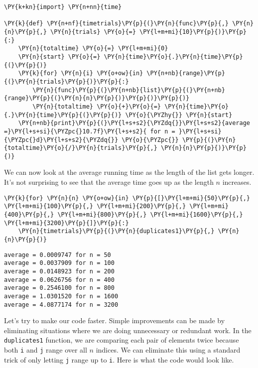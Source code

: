 \begin{Verbatim}[commandchars=\\\{\}]
\PY{k+kn}{import} \PY{n+nn}{time}

\PY{k}{def} \PY{n+nf}{timetrials}\PY{p}{(}\PY{n}{func}\PY{p}{,} \PY{n}{n}\PY{p}{,} \PY{n}{trials} \PY{o}{=} \PY{l+m+mi}{10}\PY{p}{)}\PY{p}{:}
    \PY{n}{totaltime} \PY{o}{=} \PY{l+m+mi}{0}
    \PY{n}{start} \PY{o}{=} \PY{n}{time}\PY{o}{.}\PY{n}{time}\PY{p}{(}\PY{p}{)}
    \PY{k}{for} \PY{n}{i} \PY{o+ow}{in} \PY{n+nb}{range}\PY{p}{(}\PY{n}{trials}\PY{p}{)}\PY{p}{:}
        \PY{n}{func}\PY{p}{(}\PY{n+nb}{list}\PY{p}{(}\PY{n+nb}{range}\PY{p}{(}\PY{n}{n}\PY{p}{)}\PY{p}{)}\PY{p}{)}
        \PY{n}{totaltime} \PY{o}{+}\PY{o}{=} \PY{n}{time}\PY{o}{.}\PY{n}{time}\PY{p}{(}\PY{p}{)} \PY{o}{\PYZhy{}} \PY{n}{start}
    \PY{n+nb}{print}\PY{p}{(}\PY{l+s+s2}{\PYZdq{}}\PY{l+s+s2}{average =}\PY{l+s+si}{\PYZpc{}10.7f}\PY{l+s+s2}{ for n = }\PY{l+s+si}{\PYZpc{}d}\PY{l+s+s2}{\PYZdq{}} \PY{o}{\PYZpc{}} \PY{p}{(}\PY{n}{totaltime}\PY{o}{/}\PY{n}{trials}\PY{p}{,} \PY{n}{n}\PY{p}{)}\PY{p}{)}
\end{Verbatim}



We can now look at the average running time as the length of the list gets longer.
It's not surprising to see that the average time goes up as the length $n$ increases.


\begin{Verbatim}[commandchars=\\\{\}]
\PY{k}{for} \PY{n}{n} \PY{o+ow}{in} \PY{p}{[}\PY{l+m+mi}{50}\PY{p}{,} \PY{l+m+mi}{100}\PY{p}{,} \PY{l+m+mi}{200}\PY{p}{,} \PY{l+m+mi}{400}\PY{p}{,} \PY{l+m+mi}{800}\PY{p}{,} \PY{l+m+mi}{1600}\PY{p}{,} \PY{l+m+mi}{3200}\PY{p}{]}\PY{p}{:}
    \PY{n}{timetrials}\PY{p}{(}\PY{n}{duplicates1}\PY{p}{,} \PY{n}{n}\PY{p}{)}
\end{Verbatim}

\begin{Verbatim}
average = 0.0009747 for n = 50
average = 0.0037909 for n = 100
average = 0.0148923 for n = 200
average = 0.0626756 for n = 400
average = 0.2546100 for n = 800
average = 1.0301520 for n = 1600
average = 4.0877174 for n = 3200

\end{Verbatim}


Let's try to make our code faster.
Simple improvements can be made by eliminating situations where we are doing unnecessary or redundant work.
In the \texttt{duplicates1} function, we are comparing each pair of elements twice because both \texttt{i} and \texttt{j} range over all $n$ indices.
We can eliminate this using a standard trick of only letting \texttt{j} range up to \texttt{i}.
Here is what the code would look like.

